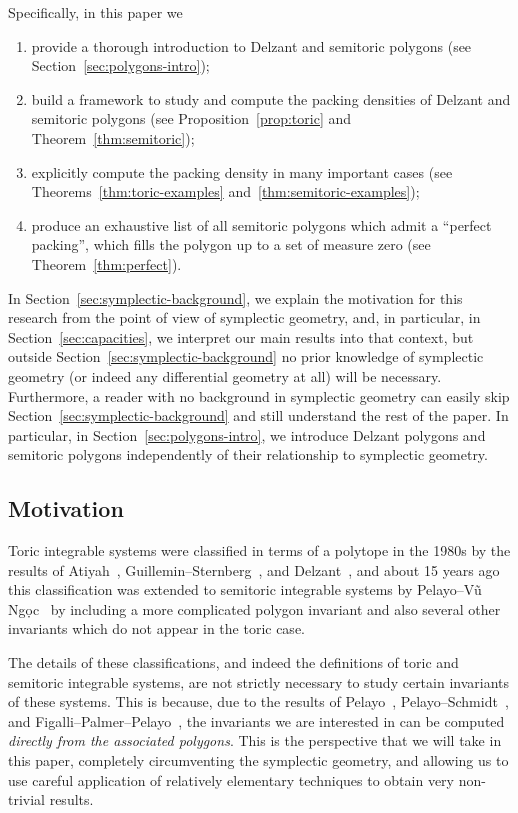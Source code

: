 \documentclass[pdftex]{sigma}
\numberwithin{equation}{section}
\begin{document}
Specifically, in this paper we
\begin{enumerate}\itemsep=0pt
 \item[(1)] provide a thorough introduction to Delzant and semitoric polygons (see Section~\ref{sec:polygons-intro});
 \item[(2)] build a framework to study and compute the packing densities of Delzant and semitoric polygons (see Proposition~\ref{prop:toric} and Theorem~\ref{thm:semitoric});
 \item[(3)] explicitly compute the packing density in many important cases (see Theorems~\ref{thm:toric-examples} and~\ref{thm:semitoric-examples});
 \item[(4)] produce an exhaustive list of all semitoric polygons which admit a ``perfect packing'', which fills the polygon up to a set of measure zero (see Theorem~\ref{thm:perfect}).
\end{enumerate}
In Section~\ref{sec:symplectic-background}, we explain
the motivation for this research from the point of view of symplectic geometry, and, in particular, in Section~\ref{sec:capacities}, we interpret our main results into that context, but outside Section~\ref{sec:symplectic-background} no prior knowledge of symplectic geometry (or indeed any differential geometry at all) will be necessary.
Furthermore, a reader with no background in symplectic geometry can easily skip Section~\ref{sec:symplectic-background} and still understand the rest of the paper.
In particular, in Section~\ref{sec:polygons-intro}, we introduce Delzant polygons and semitoric polygons independently of their relationship to symplectic geometry.

\subsection{Motivation}
Toric integrable systems
were classified in terms of a polytope in the 1980s by the results of Atiyah~\cite{Atiyah}, Guillemin--Sternberg~\cite{GuSt1982}, and Delzant~\cite{De1988},
and about 15 years ago this classification was extended to semitoric integrable systems
by Pelayo--V\~{u} Ng\d{o}c~\cite{PeVN2009,PeVN2011} by including a more complicated polygon invariant and also several other invariants which do not appear in the toric case.

The details of these classifications, and indeed the definitions of toric and semitoric integrable systems, are not strictly necessary to study certain invariants of these systems.
This is because, due to the results of Pelayo~\cite{Pe2006, Pe2007}, Pelayo--Schmidt~\cite{PeSc2008}, and Figalli--Palmer--Pelayo~\cite{FiPaPe2016}, the invariants we are interested in can be computed \emph{directly from the associated polygons}.
This is the perspective that we will take in this paper, completely circumventing the symplectic geometry, and allowing us to use careful application of relatively elementary techniques to obtain very non-trivial results.
\end{document}
